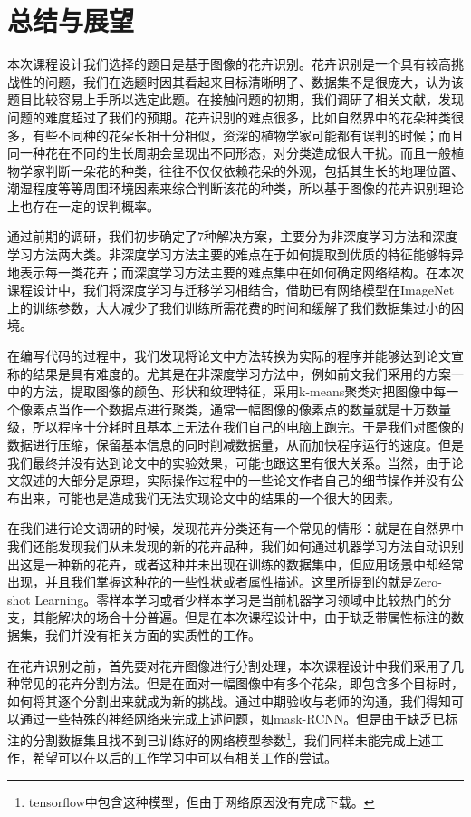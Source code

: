 \documentclass[supercite]{HustGraduPaper}
\begin{document}
\begin{sloppypar}
  \section{总结与展望}
  本次课程设计我们选择的题目是基于图像的花卉识别。花卉识别是一个具有较高挑战性的问题，我们在选题时因其看起来目标清晰明了、数据集不是很庞大，认为该题目比较容易上手所以选定此题。在接触问题的初期，我们调研了相关文献，发现问题的难度超过了我们的预期。花卉识别的难点很多，比如自然界中的花朵种类很多，有些不同种的花朵长相十分相似，资深的植物学家可能都有误判的时候；而且同一种花在不同的生长周期会呈现出不同形态，对分类造成很大干扰。而且一般植物学家判断一朵花的种类，往往不仅仅依赖花朵的外观，包括其生长的地理位置、潮湿程度等等周围环境因素来综合判断该花的种类，所以基于图像的花卉识别理论上也存在一定的误判概率。

  通过前期的调研，我们初步确定了7种解决方案，主要分为非深度学习方法和深度学习方法两大类。非深度学习方法主要的难点在于如何提取到优质的特征能够特异地表示每一类花卉；而深度学习方法主要的难点集中在如何确定网络结构。在本次课程设计中，我们将深度学习与迁移学习相结合，借助已有网络模型在ImageNet上的训练参数，大大减少了我们训练所需花费的时间和缓解了我们数据集过小的困境。

  在编写代码的过程中，我们发现将论文中方法转换为实际的程序并能够达到论文宣称的结果是具有难度的。尤其是在非深度学习方法中，例如前文我们采用的方案一中的方法，提取图像的颜色、形状和纹理特征，采用k-means聚类对把图像中每一个像素点当作一个数据点进行聚类，通常一幅图像的像素点的数量就是十万数量级，所以程序十分耗时且基本上无法在我们自己的电脑上跑完。于是我们对图像的数据进行压缩，保留基本信息的同时削减数据量，从而加快程序运行的速度。但是我们最终并没有达到论文中的实验效果，可能也跟这里有很大关系。当然，由于论文叙述的大部分是原理，实际操作过程中的一些论文作者自己的细节操作并没有公布出来，可能也是造成我们无法实现论文中的结果的一个很大的因素。

  在我们进行论文调研的时候，发现花卉分类还有一个常见的情形：就是在自然界中我们还能发现我们从未发现的新的花卉品种，我们如何通过机器学习方法自动识别出这是一种新的花卉，或者这种并未出现在训练的数据集中，但应用场景中却经常出现，并且我们掌握这种花的一些性状或者属性描述。这里所提到的就是Zero-shot Learning。零样本学习或者少样本学习是当前机器学习领域中比较热门的分支，其能解决的场合十分普遍。但是在本次课程设计中，由于缺乏带属性标注的数据集，我们并没有相关方面的实质性的工作。

  在花卉识别之前，首先要对花卉图像进行分割处理，本次课程设计中我们采用了几种常见的花卉分割方法。但是在面对一幅图像中有多个花朵，即包含多个目标时，如何将其逐个分割出来就成为新的挑战。通过中期验收与老师的沟通，我们得知可以通过一些特殊的神经网络来完成上述问题，如mask-RCNN。但是由于缺乏已标注的分割数据集且找不到已训练好的网络模型参数\footnote{tensorflow中包含这种模型，但由于网络原因没有完成下载。}，我们同样未能完成上述工作，希望可以在以后的工作学习中可以有相关工作的尝试。


\end{sloppypar}
\end{document}
